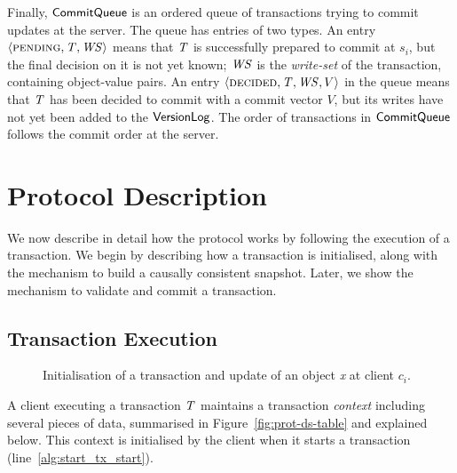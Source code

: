 Finally, $\mathsf{CommitQueue}$ is an ordered queue of transactions trying to commit updates at the server. The queue has entries of two types. An entry $\langle \text{\sc pending}, \mathit{T}, \mathit{WS} \rangle$ means that $\mathit{T}$ is successfully prepared to commit at $s_i$, but the final decision on it is not yet known; $\mathit{WS}$ is the \emph{write-set} of the transaction, containing object-value pairs. An entry $\langle \text{\sc decided}, \mathit{T}, \mathit{WS}, V \rangle$ in the queue means that $\mathit{T}$ has been decided to commit with a commit vector $V$, but its writes have not yet been added to the $\mathsf{VersionLog}$. The order of transactions in $\mathsf{CommitQueue}$ follows the commit order at the server.

\section{Protocol Description}

We now describe in detail how the protocol works by following the execution of a transaction. We begin by describing how a transaction is initialised, along with the mechanism to build a causally consistent snapshot. Later, we show the mechanism to validate and commit a transaction.

\subsection{Transaction Execution}
\label{subsect:protocol_execution}

\begin{figure}[h]
\begin{algorithm}[H]
  \setcounter{AlgoLine}{0}

  \smallskip

\end{algorithm}
\caption{Initialisation of a transaction and update of an object \emph{x} at client $c_i$.}
\end{figure}

A client executing a transaction $\mathit{T}$ maintains a transaction \emph{context} including several pieces of data, summarised in Figure~\ref{fig:prot-ds-table} and explained below. This context is initialised by the client when it starts a transaction (line~\ref{alg:start_tx_start}).

